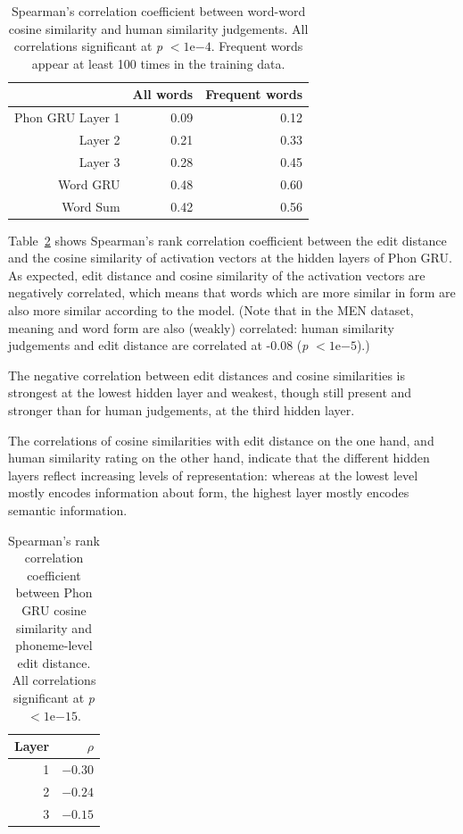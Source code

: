\begin{table}[]
	\centering
	\begin{tabular}{rrr}
                          & All words & Frequent words \\\hline
{\sc Phon GRU} Layer 1 & 0.09 & 0.12\\
		  Layer 2 & 0.21 & 0.33 \\
		  Layer 3 & 0.28 & 0.45 \\
		\hline
{\sc Word GRU} & 0.48 & 0.60\\	\hline
{\sc Word Sum} & 0.42 & 0.56
	\end{tabular}
	\caption{Spearman's correlation coefficient between
          word-word cosine similarity and human similarity judgements. All
          correlations significant at \textit{p} $< 1\mathrm{e}{-4}$. Frequent
          words appear at least 100 times in the training data.} 
\label{tab:human}
\end{table}

Table~\ref{tab:edit} shows Spearman's rank correlation coefficient between the edit distance and the cosine similarity of activation vectors at the hidden layers of {\sc Phon GRU}.
As expected, edit distance and cosine similarity of the activation vectors are negatively correlated, which means that words which are more similar in form are also more similar according to the model. (Note that in the MEN dataset, meaning and word form are also (weakly) correlated: human similarity judgements and edit distance are correlated at -0.08 (\textit{p} $< 1\mathrm{e}{-5}$).)

The negative correlation between edit distances and cosine similarities is strongest at the lowest hidden layer and weakest, though still present and stronger than for human judgements, at the third hidden layer. 

The correlations of cosine similarities with edit distance on the one hand, and human similarity rating on the other hand, indicate that the different hidden layers reflect increasing levels of representation: whereas at the lowest level mostly encodes information about form, the highest layer mostly encodes semantic information.

\begin{table}[h]
	\centering
	\begin{tabular}{rr}
                Layer   & $\rho$ \\\hline
		      1 & $-0.30$ \\
		      2 & $-0.24$ \\
		      3 & $-0.15$
	\end{tabular}
	\caption{Spearman's rank correlation coefficient between
          {\sc Phon GRU} cosine similarity and phoneme-level edit distance. All correlations significant at \textit{p} $< 1\mathrm{e}{-15}$.} 
\label{tab:edit}
\end{table}

